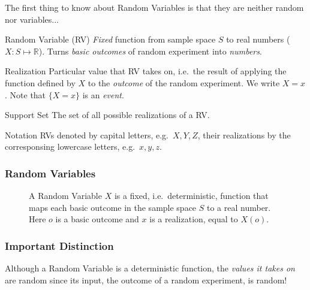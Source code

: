 \begin{frame}

\Large The first thing to know about Random Variables is that they are neither random nor variables...

\end{frame}
\begin{frame}
\begin{block}{Random Variable (RV)}
\emph{Fixed} function from sample space $S$ to real numbers ($X\colon S \mapsto \mathbb{R}$). Turns \emph{basic outcomes} of random experiment into \emph{numbers}.
\end{block}
 
\begin{block}{Realization}
Particular value that RV takes on, i.e.\ the result of applying the function defined by $X$ to the \emph{outcome} of the random experiment. We write $X= x$. Note that $\{X = x\}$ is an \emph{event}.
\end{block}
 
\begin{block}{Support Set}
The set of all possible realizations of a RV.
\end{block}
 
\begin{block}{Notation}
RVs denoted by capital letters, e.g.\ $X,Y,Z$, their realizations by the corresponsing lowercase letters, e.g.\ $x,y,z$.
\end{block}


\end{frame}
\def\RVraw{(-2.5,0) circle [radius=1.7]
	(-2.5,0) circle [radius=1.7]
	(2.5,0) circle [radius=1.7]
	node [above left] at (-3.75,1.25) {$S$}
	node [above right] at (3.75,1.25) {$\mathbb{R}$}
	node [above] at (0,2) {$X\colon S \mapsto \mathbb{R}$}}
\begin{frame}
\frametitle{Random Variables}

\begin{figure}
\centering
{}
\caption{A Random Variable $X$ is a fixed, i.e.\ deterministic, function that maps each basic outcome in the sample space $S$ to a real number. Here $o$ is a basic outcome and $x$ is a realization, equal to $X(o)$.}
\end{figure}


\end{frame}
\begin{frame}
\frametitle{Important Distinction}


Although a Random Variable is a deterministic function, the \alert{\emph{values it takes on}} are random since its input, the outcome of a random experiment, is random!


\end{frame}

